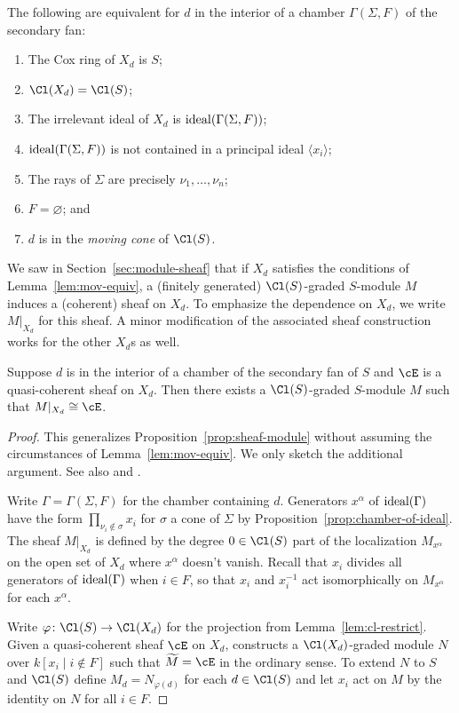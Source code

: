 \documentclass{article}
\begin{document}
\begin{lemma}\label{lem:mov-equiv}
  The following are equivalent for $d$ in the interior of a chamber $\Gamma(\Sigma,F)$ of the secondary fan:
  \begin{enumerate}
    \item  The Cox ring of $X_d$ is $S$;
    \item  $\Cl(X_d)=\Cl(S)$;
    \item  The irrelevant ideal of $X_d$ is $\operatorname{ideal}(\Gamma(\Sigma,F))$;
    \item  $\operatorname{ideal}(\Gamma(\Sigma,F))$ is not contained in a principal ideal $\langle x_i\rangle$;
    \item  The rays of $\Sigma$ are precisely $\nu_1, \dots, \nu_n$;
    \item  $F=\varnothing$; and
    \item  $d$ is in the \emph{moving cone} of $\Cl(S)$.
  \end{enumerate}
\end{lemma}

We saw in Section~\ref{sec:module-sheaf} that if $X_d$ satisfies the conditions of Lemma~\ref{lem:mov-equiv}, a (finitely generated) $\Cl(S)$-graded $S$-module $M$ induces a (coherent) sheaf on $X_d$.  To emphasize the dependence on $X_d$, we write $M|_{X_d}$ for this sheaf.  A minor modification of the associated sheaf construction works for the other $X_d$s as well.

\begin{prop}
  Suppose $d$ is in the interior of a chamber of the secondary fan of $S$ and $\cE$ is a quasi-coherent sheaf on $X_d$.  Then there exists a $\Cl(S)$-graded $S$-module $M$ such that $M|_{X_d}\cong \cE$.
\end{prop}

\begin{proof}
  This generalizes Proposition~\ref{prop:sheaf-module} without assuming the circumstances of Lemma~\ref{lem:mov-equiv}.  We only sketch the additional argument.  See also \cite[Theorem 3.2]{Cox95} and \cite[Corollary~3.6]{BEF26}.

  Write $\Gamma=\Gamma(\Sigma,F)$ for the chamber containing $d$.  Generators $x^\alpha$ of $\operatorname{ideal}(\Gamma)$ have the form $\prod_{\nu_i\notin\sigma}x_i$ for $\sigma$ a cone of $\Sigma$ by Proposition~\ref{prop:chamber-of-ideal}.  The sheaf $M|_{X_d}$ is defined by the degree $0\in\Cl(S)$ part of the localization $M_{x^\alpha}$ on the open set of $X_d$ where $x^\alpha$ doesn't vanish.  Recall that $x_i$ divides all generators of $\operatorname{ideal}(\Gamma)$ when $i\in F$, so that $x_i$ and $x_i^{-1}$ act isomorphically on $M_{x^\alpha}$ for each $x^\alpha$.

  Write $\varphi\colon\Cl(S)\to\Cl(X_d)$ for the projection from Lemma~\ref{lem:cl-restrict}.  Given a quasi-coherent sheaf $\cE$ on $X_d$, \cite[Theorem~3.2]{Cox95} constructs a $\Cl(X_d)$-graded module $N$ over $k[x_i\mid i\notin F]$ such that $\widetilde M=\cE$ in the ordinary sense.  To extend $N$ to $S$ and $\Cl(S)$ define $M_d=N_{\varphi(d)}$ for each $d\in\Cl(S)$ and let $x_i$ act on $M$ by the identity on $N$ for all $i\in F$.
\end{proof}
\end{document}
